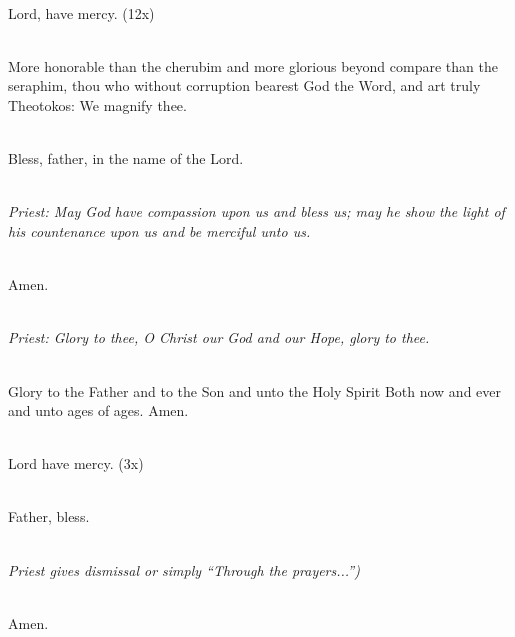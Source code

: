 \mbox{}\\
Lord, have mercy. (12x)

\mbox{}\\
More honorable than the cherubim
and more glorious beyond compare than the seraphim,
thou who without corruption bearest God the Word,
and art truly Theotokos: We magnify thee.

\mbox{}\\
Bless, father, in the name of the Lord.

\mbox{}\\
\emph{Priest: May God have compassion upon us and bless us;
may he show the light of his countenance upon us and be merciful unto us.}

\mbox{}\\
Amen.

\mbox{}\\
\emph{Priest: Glory to thee,
O Christ our God and our Hope, glory to thee.}

\mbox{}\\
Glory to the Father and to the Son and unto the Holy Spirit
Both now and ever and unto ages of ages. Amen.

\mbox{}\\
Lord have mercy. (3x)

\mbox{}\\
Father, bless.

\mbox{}\\
\emph{Priest gives dismissal or simply ``Through the prayers...'')}

\mbox{}\\
Amen.
